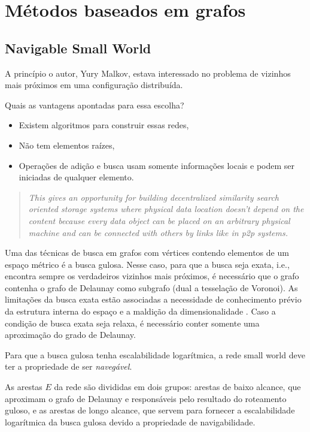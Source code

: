 \section{Métodos baseados em grafos}

\subsection{Navigable Small World}

A princípio\cite{scalable:malkov2012,smallworldgraphs:malkov2014} o autor, Yury Malkov, estava interessado no problema de vizinhos mais próximos em uma configuração distribuída.

Quais as vantagens apontadas para essa escolha?
\begin{itemize}
    \item Existem algoritmos para construir essas redes,
    \item Não tem elementos raízes,
    \item Operações de adição e busca usam somente informações locais e podem ser iniciadas de qualquer elemento.
\end{itemize}

\begin{quotation}
    \it This gives an opportunity for building decentralized similarity search oriented storage
    systems where physical data location doesn't depend on the content because every
    data object can be placed on an arbitrary physical machine and can be connected with
    others by links like in p2p systems.
\end{quotation}

Uma das técnicas de busca em grafos com vértices contendo elementos de um espaço métrico é a busca gulosa. Nesse caso, para que a busca seja exata, i.e., encontra sempre os verdadeiros vizinhos mais próximos, é necessário que o grafo contenha o grafo de Delaunay como subgrafo ({\color{purple}dual a tesselação de Voronoi}). As limitações da busca exata estão associadas a necessidade de conhecimento prévio da estrutura interna do espaço\cite{searching:navarro2002} e a maldição da dimensionalidade \cite{voronoi:aurenhammer1991}. Caso a condição de busca exata seja relaxa, é necessário conter somente uma aproximação do grado de Delaunay.

Para que a busca gulosa tenha escalabilidade logarítmica, a rede small world deve ter a propriedade de ser \textit{navegável}.\cite{smallworld:kleinberg2000}

As arestas $E$ da rede são divididas em dois grupos: arestas de baixo alcance, que aproximam o grafo de Delaunay e responsáveis pelo resultado do roteamento guloso, e as arestas de longo alcance, que servem para fornecer a escalabilidade logarítmica da busca gulosa devido a propriedade de navigabilidade.

